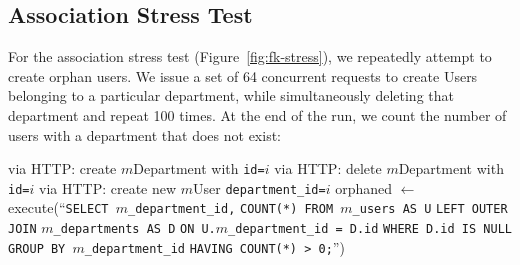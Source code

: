 \subsection{Association Stress Test}
\label{sec:appendix-association-stress}

For the association stress test (Figure~\ref{fig:fk-stress}), we repeatedly attempt to create orphan users. We issue a set of 64 concurrent requests to create Users belonging to a particular department, while simultaneously deleting that department and repeat 100 times. At the end of the run, we count the number of users with a department that does not exist:
\begin{algorithm}[H]
\begin{algorithmic}

    \State via HTTP: create $m$Department with \texttt{id=$i$}
  \EndFor
        \State via HTTP: delete $m$Department with \texttt{id=$i$}
      \Else
        \State via HTTP: create new $m$User \texttt{department\_id=$i$}
      \EndIf        
     \EndParFor
   \EndFor
   \State orphaned $\gets $execute(``\texttt{SELECT $m$\_department\_id,}
   \State \hspace{8.5em}\texttt{COUNT(*) FROM $m$\_users AS U}
   \State \hspace{8.5em}\texttt{LEFT OUTER JOIN} \texttt{$m$\_departments AS D}
   \State \hspace{8.5em}\texttt{ON U.$m$\_department\_id = D.id}
   \State \hspace{8.5em}\texttt{WHERE D.id IS NULL}
   \State \hspace{8.5em}\texttt{GROUP BY $m$\_department\_id}
   \State \hspace{8.5em}\texttt{HAVING COUNT(*) > 0;}'')
\EndFor
\end{algorithmic}
\end{algorithm}

